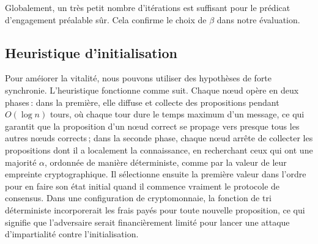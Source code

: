 \documentclass[letterpaper,twocolumn,10pt]{article}
\newcommand{\Oh}[1]{O(#1)}
\theoremstyle{definition}
\begin{document}
\begin{appendices}
\noindent Globalement, un très petit nombre d'itérations est suffisant pour le prédicat d'engagement préalable sûr. Cela confirme le choix de $\beta$ dans notre évaluation.

\subsection{Heuristique d'initialisation}
\label{sec:sync-heuristic}
Pour améiorer la vitalité, nous pouvons utiliser des hypothèses de forte synchronie. L'heuristique fonctionne comme suit. Chaque nœud opère en deux phases\,: dans la première, elle diffuse et collecte des propositions pendant $\Oh{\log{n}}$ tours, où chaque tour dure le temps maximum d'un message, ce qui garantit que la proposition d'un nœud correct se propage vers presque tous les autres nœuds corrects\,; dans la seconde phase, chaque nœud arrête de collecter les propositions dont il a localement la connaissance, en recherchant ceux qui ont une majorité $\alpha$, ordonnée de manière déterministe, comme par la valeur de leur empreinte cryptographique. Il sélectionne ensuite la première valeur dans l'ordre pour en faire son état initial quand il commence vraiment le protocole de consensus.
Dans une configuration de cryptomonnaie, la fonction de tri déterministe incorporerait les frais payés pour toute nouvelle proposition, ce qui signifie que l'adversaire serait financièrement limité pour lancer une attaque d'impartialité contre l'initialisation.


\end{appendices}
\end{document}
